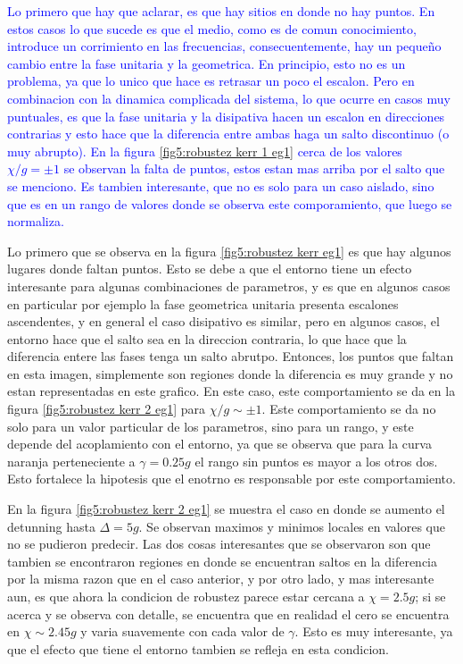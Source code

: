 \textcolor{blue}{Lo primero que hay que aclarar, es que hay sitios en donde no hay puntos. En estos casos lo que sucede es que el medio, como es de comun conocimiento, introduce un corrimiento en las frecuencias, consecuentemente, hay un pequeño cambio entre la fase unitaria y la geometrica. En principio, esto no es un problema, ya que lo unico que hace es retrasar un poco el escalon. Pero en combinacion con la dinamica complicada del sistema, lo que ocurre en casos muy puntuales, es que la fase unitaria y la disipativa hacen un escalon en direcciones contrarias y esto hace que la diferencia entre ambas haga un salto discontinuo (o muy abrupto). En la figura \ref{fig5:robustez kerr 1 eg1} cerca de los valores $\chi/g=\pm 1$ se observan la falta de puntos, estos estan mas arriba por el salto que se menciono. Es tambien interesante, que no es solo para un caso aislado, sino que es en un rango de valores donde se observa este comporamiento, que luego se normaliza. }

Lo primero que se observa en la figura \ref{fig5:robustez kerr eg1} es que hay algunos lugares donde faltan puntos. Esto se debe a que el entorno tiene un efecto interesante para algunas combinaciones de parametros, y es que en algunos casos en particular por ejemplo la fase geometrica unitaria presenta escalones ascendentes, y en general el caso disipativo es similar, pero en algunos casos, el entorno hace que el salto sea en la direccion contraria, lo que hace que la diferencia entere las fases tenga un salto abrutpo. Entonces, los puntos que faltan en esta imagen, simplemente son regiones donde la diferencia es muy grande y no estan representadas en este grafico. En este caso, este comportamiento se da en la figura \ref{fig5:robustez kerr 2 eg1} para $\chi / g \sim \pm 1$. Este comportamiento se da no solo para un valor particular de los parametros, sino para un rango, y este depende del acoplamiento con el entorno, ya que se observa que para la curva naranja perteneciente a $\gamma=0.25g$ el rango sin puntos es mayor a los otros dos. Esto fortalece la hipotesis que el enotrno es responsable por este comportamiento.

En la figura \ref{fig5:robustez kerr 2 eg1} se muestra el caso en donde se aumento el detunning hasta $\Delta=5g$. Se observan maximos y minimos locales en valores que no se pudieron predecir. Las dos cosas interesantes que se observaron son que tambien se encontraron regiones en donde se encuentran saltos en la diferencia por la misma razon que en el caso anterior, y por otro lado, y mas interesante aun, es que ahora la condicion de robustez parece estar cercana a $\chi=2.5g$; si se acerca y se observa con detalle, se encuentra que en realidad el cero se encuentra en $\chi\sim 2.45g$ y varia suavemente con cada valor de $\gamma$. Esto es muy interesante, ya que el efecto que tiene el entorno tambien se refleja en esta condicion.

